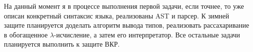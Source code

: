 \documentclass[12pt]{scrartcl}
\begin{document}

На данный момент я в процессе выполнения первой задачи, если точнее, то уже описан конкретный синтаксис языка, реализованы AST и парсер.
К зимней защите планируется доделать алгоритм вывода типов, реализовать рассахаривание в обогащенное $\lambda$-исчисление, а затем его интерпретатор.
Все остальные задачи планируется выполнить к защите ВКР.
\end{document}
